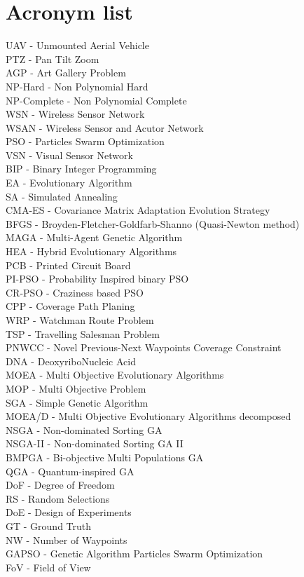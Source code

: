 \documentclass[english]{spimubphdthesis}
\begin{document}
 \section{Acronym list}
UAV - Unmounted Aerial Vehicle \\
PTZ - Pan Tilt Zoom \\
AGP - Art Gallery Problem \\
NP-Hard - Non Polynomial Hard  \\ 
NP-Complete - Non Polynomial Complete  \\ 
WSN - Wireless Sensor Network \\
WSAN - Wireless Sensor and Acutor Network\\
PSO - Particles Swarm Optimization \\
VSN - Visual Sensor Network \\
BIP - Binary Integer Programming \\
EA - Evolutionary Algorithm \\
SA - Simulated Annealing \\
CMA-ES - Covariance Matrix Adaptation Evolution Strategy\\
BFGS - Broyden-Fletcher-Goldfarb-Shanno (Quasi-Newton method)\\
MAGA - Multi-Agent Genetic Algorithm \\
HEA - Hybrid Evolutionary Algorithms  \\
PCB - Printed Circuit Board  \\
PI-PSO  - Probability Inspired binary PSO \\
CR-PSO - Craziness based PSO  \\
CPP - Coverage Path Planing   \\
WRP - Watchman Route Problem \\ 
TSP - Travelling Salesman Problem \\ 
PNWCC - Novel Previous-Next Waypoints Coverage Constraint \\ 
DNA - DeoxyriboNucleic Acid \\
MOEA - Multi Objective Evolutionary Algorithms \\
MOP - Multi Objective Problem \\
SGA - Simple Genetic Algorithm  \\
MOEA/D - Multi Objective Evolutionary Algorithms  decomposed\\
NSGA - Non-dominated Sorting GA \\
NSGA-II - Non-dominated Sorting GA II \\
BMPGA - Bi-objective Multi Populations GA \\
QGA - Quantum-inspired GA \\
DoF - Degree of Freedom \\
RS - Random Selections \\
DoE - Design of Experiments \\
GT - Ground Truth \\
NW - Number of Waypoints \\
GAPSO -  Genetic Algorithm Particles Swarm Optimization  \\
FoV - Field of View \\
\end{document}
